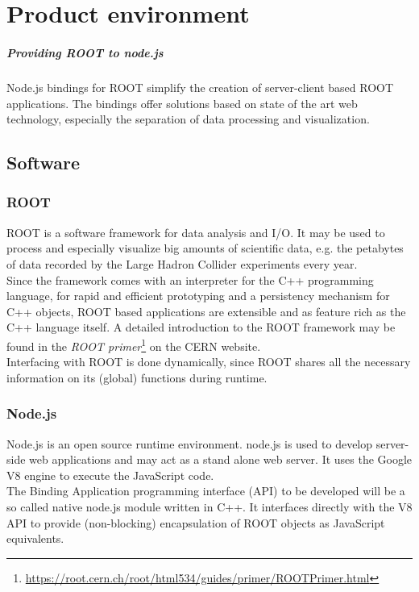 \chapter{Product environment}

\paragraph{Providing ROOT to node.js}
Node.js bindings for ROOT simplify the creation of server-client based ROOT applications. The bindings offer solutions based on state of the art web technology, especially the separation of data 
processing and visualization.\\

\section{Software}
\subsection{ROOT}
ROOT is a software framework for data analysis and I/O. It may be used to process and especially visualize big amounts of scientific data, e.g. the petabytes of data recorded by the Large Hadron Collider experiments every year.\\
Since the framework comes with an interpreter for the C++ programming language, for rapid and efficient prototyping and a persistency mechanism for C++ objects, ROOT based applications are  extensible and as feature rich as the C++ language itself.
A detailed introduction to the ROOT framework may be found in the \textit{ROOT  primer}\footnote[1]{\url{https://root.cern.ch/root/html534/guides/primer/ROOTPrimer.html}}
on the CERN website.\\
Interfacing with ROOT is done dynamically, since ROOT shares all the necessary information on its (global) functions during runtime.

\subsection{Node.js}
Node.js is an open source runtime environment. node.js is used to develop server-side web applications and may act as a 
stand alone web server. It uses the Google V8 engine to execute the JavaScript code. \\
The Binding Application programming interface (API) to be developed will be a so called native node.js module written in C++. It interfaces directly with the V8 API to provide (non-blocking) encapsulation of ROOT objects as JavaScript equivalents.

